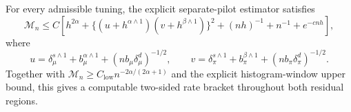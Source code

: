 For every admissible tuning, the explicit separate-pilot estimator satisfies
\[
\mathcal M_n\le C\left[h^{2\alpha}+\{(u+h^{\alpha\wedge1})(v+h^{\beta\wedge1})\}^2+(nh)^{-1}+n^{-1}+e^{-cnh}\right],
\]
where
\[
u=\delta_\mu^{s\wedge1}+b_\mu^{\alpha\wedge1}+(nb_\mu\delta_\mu^d)^{-1/2},
\qquad
v=\delta_\pi^{s\wedge1}+b_\pi^{\beta\wedge1}+(nb_\pi\delta_\pi^d)^{-1/2}.
\]
Together with \(\mathcal M_n\ge C_{\mathrm{low}}n^{-2\alpha/(2\alpha+1)}\) and the explicit histogram-window upper bound, this gives a computable two-sided rate bracket throughout both residual regions.